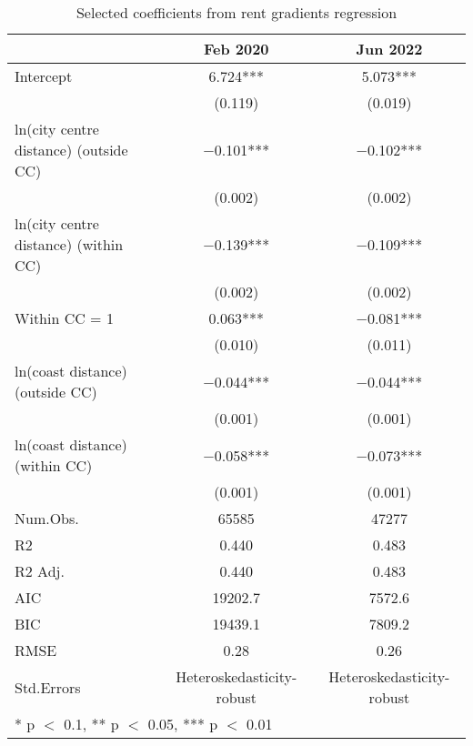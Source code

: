 \documentclass[10pt,openany,leqno]{e61note}
\begin{document}
\begin{table}[ht]
\centering
\caption{Selected coefficients from rent gradients regression}\label{tab:pre-post-regs}
\begin{tabular}{lcc}
\toprule
  & Feb 2020 & Jun 2022\\
\midrule
Intercept & \num{6.724}*** & \num{5.073}***\\
 & (\num{0.119}) & (\num{0.019})\\
ln(city centre distance) (outside CC) & \num{-0.101}*** & \num{-0.102}***\\
 & (\num{0.002}) & \vphantom{1} (\num{0.002})\\
ln(city centre distance) (within CC) & \num{-0.139}*** & \num{-0.109}***\\
 & (\num{0.002}) & (\num{0.002})\\
Within CC = 1 & \num{0.063}*** & \num{-0.081}***\\
 & (\num{0.010}) & (\num{0.011})\\
ln(coast distance) (outside CC) & \num{-0.044}*** & \num{-0.044}***\\
 & (\num{0.001}) & \vphantom{1} (\num{0.001})\\
ln(coast distance) (within CC) & \num{-0.058}*** & \num{-0.073}***\\
 & (\num{0.001}) & (\num{0.001})\\
\midrule
Num.Obs. & \num{65585} & \num{47277}\\
R2 & \num{0.440} & \num{0.483}\\
R2 Adj. & \num{0.440} & \num{0.483}\\
AIC & \num{19202.7} & \num{7572.6}\\
BIC & \num{19439.1} & \num{7809.2}\\
RMSE & \num{0.28} & \num{0.26}\\
Std.Errors & Heteroskedasticity-robust & Heteroskedasticity-robust\\
\bottomrule
\multicolumn{3}{l}{\rule{0pt}{1em}* p $<$ 0.1, ** p $<$ 0.05, *** p $<$ 0.01}\\
\end{tabular}
\end{table}
\end{document}
